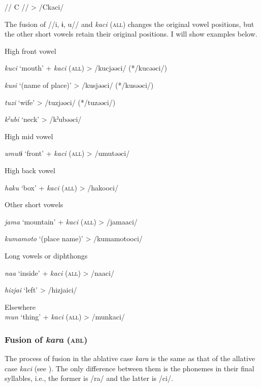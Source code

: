 \begin{table}
    //  C  //        >  /Ckaci/

The fusion of //i, ɨ, u// and \textit{kaci} (\textsc{all}) changes the original vowel positions, but the other short vowels retain their original positions. I will show examples below.

\ea\label{ex:6-32}
 \ea High front vowel  \\
\gll

    \textit{kuci}  ‘mouth’  +  \textit{kaci} (\textsc{all})  >  /kucjəəci/  (*/kucəəci/)

    \textit{kusi}  ‘(name of place)’      >  /kusjəəci/  (*/kusəəci/)

    \textit{tuzi}  ‘wife’      >  /tuzjəəci/  (*/tuzəəci/)

    \textit{kˀubi}  ‘neck’      >  /kˀubəəci/  

\ex High mid vowel\\
\gll

    \textit{umutɨ}  ‘front’  +  \textit{kaci} (\textsc{all})  >  /umutəəci/

\ex High back vowel  \\
\gll

    \textit{haku}  ‘box’  +  \textit{kaci} (\textsc{all})  >  /hakooci/

\ex Other short vowels\\
\gll

    \textit{jama}  ‘mountain’  +  \textit{kaci} (\textsc{all})  >  /jamaaci/

    \textit{kumamoto}  ‘(place name)’      >  /kumamotooci/  

\ex Long vowels or diphthongs  \\
\gll

    \textit{naa}  ‘inside’  +  \textit{kaci} (\textsc{all})  >  /naaci/

    \textit{hizjai}  ‘left’      >  /hizjaici/  

\ex  Elsewhere\\
\textit{mun}  ‘thing’  +  \textit{kaci} (\textsc{all})  >  /munkaci/\\
\z
\z

\subsubsection{Fusion of \textit{kara} (\textsc{abl})}
\label{bkm:Ref365151812}
The process of fusion in the ablative case \textit{kara} is the same as that of the allative case \textit{kaci} (see ). The only difference between them is the phonemes in their final syllables, i.e., the former is /ra/ and the latter is /ci/.


\end{table}
